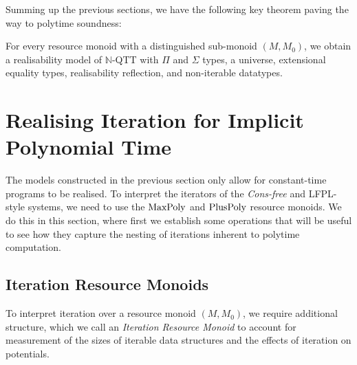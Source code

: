 \documentclass[acmsmall,review,screen,anonymous]{acmart}
\begin{document}
Summing up the previous sections, we have the following key theorem
paving the way to polytime soundness:
\begin{theorem}\label{thm:basic-qtt-realisability-model}
  For every resource monoid with a distinguished sub-monoid
  $(M, M_0)$, we obtain a realisability model of $\mathbb{N}$-QTT with
  $\Pi$ and $\Sigma$ types, a universe, extensional equality types,
  realisability reflection, and non-iterable datatypes.
\end{theorem}

\section{Realising Iteration for Implicit Polynomial Time}
\label{sec:realising-iteration}

The models constructed in the previous section only allow for
constant-time programs to be realised. To interpret the iterators of
the \emph{Cons-free} and LFPL-style systems, we need to use the
$\mathrm{MaxPoly}$ and $\mathrm{PlusPoly}$ resource monoids. We do this in this
section, where first we establish some operations that will be useful
to see how they capture the nesting of iterations inherent to polytime
computation.

\subsection{Iteration Resource Monoids}

To interpret iteration over a resource monoid $(M, M_0)$, we require
additional structure, which we call an \emph{Iteration Resource
  Monoid} to account for measurement of the sizes of iterable data
structures and the effects of iteration on potentials.
\end{document}
